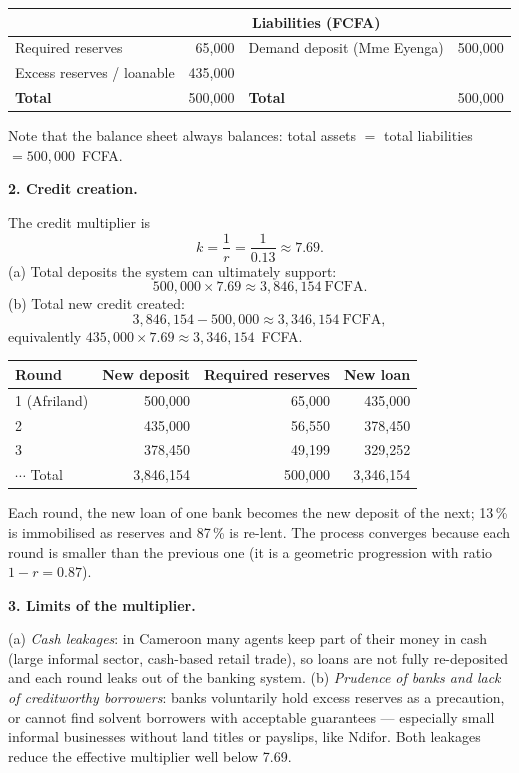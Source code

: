 \documentclass[11pt]{article}
\begin{document}
\begin{center}
\begin{tabular}{|l r|l r|}
\hline
\rowcolor{popblueL} \multicolumn{2}{|c|}{\textbf{Assets (FCFA)}} & \multicolumn{2}{c|}{\textbf{Liabilities (FCFA)}} \\
\hline
Required reserves & 65,000 & Demand deposit (Mme Eyenga) & 500,000 \\
Excess reserves / loanable & 435,000 & & \\
\hline
\textbf{Total} & 500,000 & \textbf{Total} & 500,000 \\
\hline
\end{tabular}
\end{center}

Note that the balance sheet always balances: total assets $=$ total liabilities $= 500{,}000$~FCFA.

\textbf{2. Credit creation.}\par
The credit multiplier is
\[ k = \frac{1}{r} = \frac{1}{0.13} \approx 7.69. \]
(a) Total deposits the system can ultimately support:
\[ 500{,}000 \times 7.69 \approx 3{,}846{,}154\ \text{FCFA}. \]
(b) Total new credit created:
\[ 3{,}846{,}154 - 500{,}000 \approx 3{,}346{,}154\ \text{FCFA}, \]
equivalently $435{,}000 \times 7.69 \approx 3{,}346{,}154$~FCFA.

\begin{center}
\begin{tabular}{|l|r|r|r|}
\hline
\rowcolor{popblueL} \textbf{Round} & \textbf{New deposit} & \textbf{Required reserves} & \textbf{New loan} \\
\hline
1 (Afriland) & 500,000 & 65,000 & 435,000 \\
2 & 435,000 & 56,550 & 378,450 \\
3 & 378,450 & 49,199 & 329,252 \\
\hline
$\cdots$ Total & 3,846,154 & 500,000 & 3,346,154 \\
\hline
\end{tabular}
\end{center}

Each round, the new loan of one bank becomes the new deposit of the next; 13\,\% is immobilised as reserves and 87\,\% is re-lent. The process converges because each round is smaller than the previous one (it is a geometric progression with ratio $1 - r = 0.87$).

\textbf{3. Limits of the multiplier.}\par
(a) \emph{Cash leakages}: in Cameroon many agents keep part of their money in cash (large informal sector, cash-based retail trade), so loans are not fully re-deposited and each round leaks out of the banking system. (b) \emph{Prudence of banks and lack of creditworthy borrowers}: banks voluntarily hold excess reserves as a precaution, or cannot find solvent borrowers with acceptable guarantees --- especially small informal businesses without land titles or payslips, like Ndifor. Both leakages reduce the effective multiplier well below 7.69.
\end{document}
